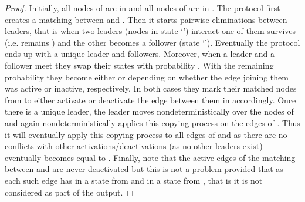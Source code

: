 \documentclass[oribibl, 11pt]{llncs}
\begin{document}
\begin{proof}
Initially, all nodes of  are in  and all nodes of  are in . The protocol first creates a matching between  and . Then it starts pairwise eliminations between leaders, that is when two leaders (nodes in state `') interact one of them survives (i.e. remains ) and the other becomes a follower (state `'). Eventually the protocol ends up with a unique leader and  followers. Moreover, when a leader and a follower meet they swap their states with probability . With the remaining  probability they become either  or  depending on whether the edge joining them was active or inactive, respectively. In both cases they mark their matched nodes from  to either activate or deactivate the edge between them in  accordingly. Once there is a unique leader, the leader moves nondeterministically over the nodes of  and again nondeterministically applies this copying process on the edges of . Thus it will eventually apply this copying process to all edges of  and as there are no conflicts with other activations/deactivations (as no other leaders exist)  eventually becomes equal to . Finally, note that the active edges of the matching between  and  are never deactivated but this is not a problem provided that  as each such edge  has  in a state from  and  in a state from , that is it is not considered as part of the output.


\end{proof}
\end{document}
